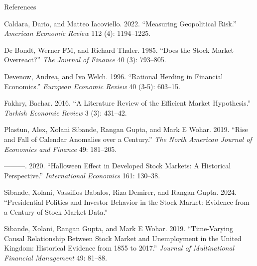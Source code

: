 \documentclass[
  12pt,
  ignorenonframetext,
]{beamer}
\newlength{\cslhangindent}
\newenvironment{CSLReferences}[2] %
 {\begin{list}{}{%
  \setlength{\itemindent}{0pt}
  \setlength{\leftmargin}{0pt}
  \setlength{\parsep}{0pt}
  \ifodd #1
   \setlength{\leftmargin}{\cslhangindent}
   \setlength{\itemindent}{-1\cslhangindent}
  \fi
  \setlength{\itemsep}{#2\baselineskip}}}
 {\end{list}}
\begin{document}
\begin{frame}[allowframebreaks]{References}
\label{references}
\small
{}

\label{refs}
\begin{CSLReferences}{1}{0}
Caldara, Dario, and Matteo Iacoviello. 2022. {``Measuring Geopolitical
Risk.''} \emph{American Economic Review} 112 (4): 1194--1225.

De Bondt, Werner FM, and Richard Thaler. 1985. {``Does the Stock Market
Overreact?''} \emph{The Journal of Finance} 40 (3): 793--805.

Devenow, Andrea, and Ivo Welch. 1996. {``Rational Herding in Financial
Economics.''} \emph{European Economic Review} 40 (3-5): 603--15.

Fakhry, Bachar. 2016. {``A Literature Review of the Efficient Market
Hypothesis.''} \emph{Turkish Economic Review} 3 (3): 431--42.

Plastun, Alex, Xolani Sibande, Rangan Gupta, and Mark E Wohar. 2019.
{``Rise and Fall of Calendar Anomalies over a Century.''} \emph{The
North American Journal of Economics and Finance} 49: 181--205.

---------. 2020. {``Halloween Effect in Developed Stock Markets: A
Historical Perspective.''} \emph{International Economics} 161: 130--38.

Sibande, Xolani, Vassilios Babalos, Riza Demirer, and Rangan Gupta.
2024. {``Presidential Politics and Investor Behavior in the Stock
Market: Evidence from a Century of Stock Market Data.''}

Sibande, Xolani, Rangan Gupta, and Mark E Wohar. 2019. {``Time-Varying
Causal Relationship Between Stock Market and Unemployment in the United
Kingdom: Historical Evidence from 1855 to 2017.''} \emph{Journal of
Multinational Financial Management} 49: 81--88.

\end{CSLReferences}
\end{frame}
\end{document}
